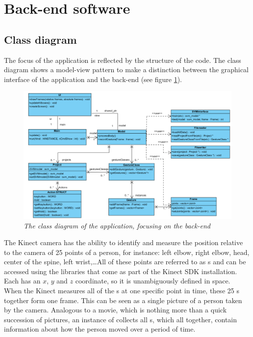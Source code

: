 \section{Back-end software}

\subsection{Class diagram}

The focus of the application is reflected by the structure of the code. The class diagram shows a model-view pattern to make a distinction between the graphical interface of the application and the back-end (see figure \ref{fig: backend_classdiagram}).\\

\begin{figure}[H]
\begin{center}
\includegraphics[width=14cm]{ClassDiagramBackEnd.png}
\caption{\emph{The class diagram of the application, focusing on the back-end}}
\label{fig: backend_classdiagram}
\end{center}
\end{figure}

The Kinect camera has the ability to identify and measure the position relative to the camera of 25 points of a person, for instance: left elbow, right elbow, head, center of the spine, left wrist,\ldots All of these points are referred to as s and can be accessed using the libraries that come as part of the Kinect SDK installation. Each  has an $x$, $y$ and $z$ coordinate, so it is unambiguously defined in space.\\

When the Kinect measures all of the s at one specific point in time, these 25 s together form one frame. This can be seen as a single picture of a person taken by the camera. Analogous to a movie, which is nothing more than a quick succession of pictures, an instance of  collects all s, which all together, contain information about how the person moved over a period of time.\\

